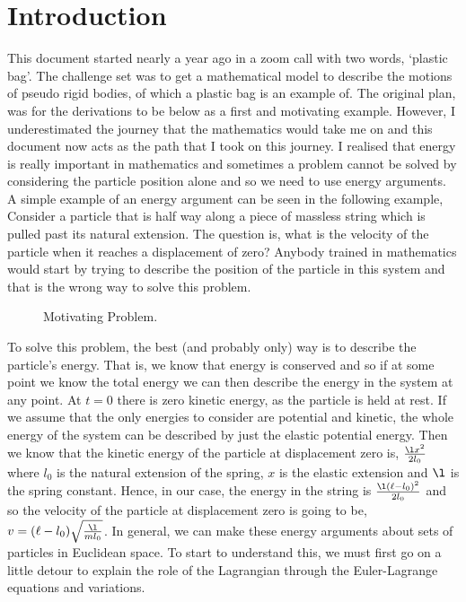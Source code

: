 
\section{Introduction}

This document started nearly a year ago in a zoom call with two words, `plastic bag'. The challenge set was to get a mathematical model to describe the motions of pseudo rigid bodies, of which a plastic bag is an example of. The original plan, was for the derivations to be below as a first and motivating example. However, I underestimated the journey that the mathematics would take me on and this document now acts as the path that I took on this journey. I realised that energy is really important in mathematics and sometimes a problem cannot be solved by considering the particle position alone and so we need to use energy arguments. A simple example of an energy argument can be seen in the following example,\\

\noindent
Consider a particle that is half way along a piece of massless string which is pulled past its natural extension. The question is, what is the velocity of the particle when it reaches a displacement of zero? Anybody trained in mathematics would start by trying to describe the position of the particle in this system and that is the wrong way to solve this problem.\\

\begin{figure}[!ht]
\centering
\resizebox{0.2\textwidth}{!}{}
\caption{Motivating Problem.}
\end{figure}

\noindent
To solve this problem, the best (and probably only) way is to describe the particle's energy. That is, we know that energy is conserved and so if at some point we know the total energy we can then describe the energy in the system at any point. At $t = 0$ there is zero kinetic energy, as the particle is held at rest. If we assume that the only energies to consider are potential and kinetic, the whole energy of the system can be described by just the elastic potential energy. Then we know that the kinetic energy of the particle at displacement zero is, $\frac{\l x^2}{2l_0}$ where $l_0$ is the natural extension of the spring, $x$ is the elastic extension and $\l$ is the spring constant. Hence, in our case, the energy in the string is $\frac{\l (\ell - l_0)^2}{2l_0}$ and so the velocity of the particle at displacement zero is going to be, $v = (\ell - l_0)\sqrt{\frac{\l}{ml_0}}$. In general, we can make these energy arguments about sets of particles in Euclidean space. To start to understand this, we must first go on a little detour to explain the role of the Lagrangian through the Euler-Lagrange equations and variations. \\

